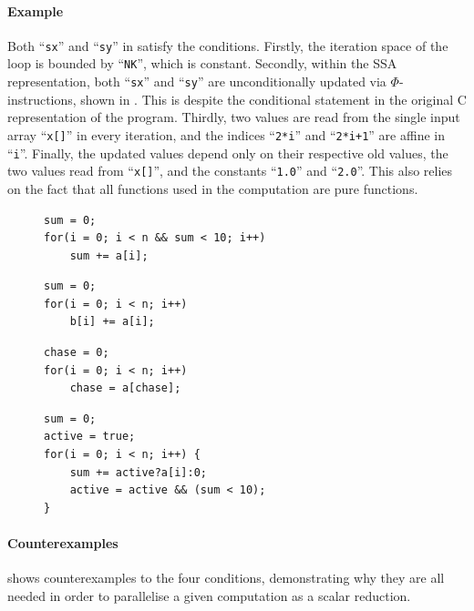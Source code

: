     \paragraph*{Example}
    Both ``\texttt{sx}'' and ``\texttt{sy}'' in
     satisfy the conditions.
    Firstly, the iteration space of the loop is bounded by ``\texttt{NK}'',
    which is constant.
    Secondly, within the SSA representation, both ``\texttt{sx}'' and
    ``\texttt{sy}'' are unconditionally updated via $\Phi$-instructions, shown
    in .
    This is despite the conditional statement in the original C representation
    of the program.
    Thirdly, two values are read from the single input array ``\texttt{x[]}''
    in every iteration, and the indices ``\texttt{2*i}'' and
    ``\texttt{2*i+1}'' are affine in ``\texttt{i}''.
    Finally, the updated values depend only on their respective old values,
    the two values read from ``\texttt{x[]}'', and the constants
    ``\texttt{1.0}'' and ``\texttt{2.0}''.
    This also relies on the fact that all functions used in the computation are
    pure functions.

\begin{figure}[t]
\begin{lstlisting}[language=MyCpp]
sum = 0;
for(i = 0; i < n && sum < 10; i++)
    sum += a[i];
\end{lstlisting}
\begin{lstlisting}[language=MyCpp]
sum = 0;
for(i = 0; i < n; i++)
    b[i] += a[i];
\end{lstlisting}
\begin{lstlisting}[language=MyCpp]
chase = 0;
for(i = 0; i < n; i++)
    chase = a[chase];
\end{lstlisting}
\begin{lstlisting}[language=MyCpp,label={counterexamples},caption=
   {Counterexamples to the four conditions: None of these computations can be
    parallelised as scalar reductions.
    The first and last example implement the same program.}]
sum = 0;
active = true;
for(i = 0; i < n; i++) {
    sum += active?a[i]:0;
    active = active && (sum < 10);
}
\end{lstlisting}
\end{figure}

    \paragraph*{Counterexamples}
     shows counterexamples to the four conditions,
    demonstrating why they are all needed in order to parallelise a given
    computation as a scalar reduction.

